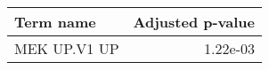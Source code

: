 \begin{tabular}{lr}
\toprule
   Term name &  Adjusted p-value \\
\midrule
MEK UP.V1 UP &          1.22e-03 \\
\bottomrule
\end{tabular}
